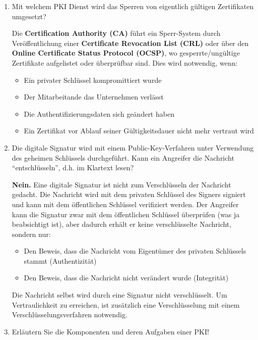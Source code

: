 \documentclass[a4paper]{article}
\begin{document}
\begin{enumerate}
    \item Mit welchem PKI Dienst wird das Sperren von eigentlich gültigen Zertifikaten umgesetzt?
    
    Die \textbf{Certification Authority (CA)} führt ein Sperr-System durch Veröffentlichung einer \textbf{Certificate Revocation List (CRL)} oder über den \textbf{Online Certificate Status Protocol (OCSP)}, wo gesperrte/ungültige Zertifikate aufgelistet oder überprüfbar sind. Dies wird notwendig, wenn:
    \begin{itemize}
        \item Ein privater Schlüssel kompromittiert wurde
        \item Der Mitarbeitande das Unternehmen verlässt
        \item Die Authentifizierungsdaten sich geändert haben
        \item Ein Zertifikat vor Ablauf seiner Gültigkeitsdauer nicht mehr vertraut wird
    \end{itemize}
    
    \item Die digitale Signatur wird mit einem Public-Key-Verfahren unter Verwendung des geheimen Schlüssels durchgeführt. Kann ein Angreifer die Nachricht ``entschlüsseln'', d.h. im Klartext lesen?
    
    \textbf{Nein.} Eine digitale Signatur ist nicht zum Verschlüsseln der Nachricht gedacht. Die Nachricht wird mit dem privaten Schlüssel des Signers signiert und kann mit dem öffentlichen Schlüssel verifiziert werden. Der Angreifer kann die Signatur zwar mit dem öffentlichen Schlüssel überprüfen (was ja beabsichtigt ist), aber dadurch erhält er keine verschlüsselte Nachricht, sondern nur:
    \begin{itemize}
        \item Den Beweis, dass die Nachricht vom Eigentümer des privaten Schlüssels stammt (Authentizität)
        \item Den Beweis, dass die Nachricht nicht verändert wurde (Integrität)
    \end{itemize}
    
    Die Nachricht selbst wird durch eine Signatur nicht verschlüsselt. Um Vertraulichkeit zu erreichen, ist zusätzlich eine Verschlüsselung mit einem Verschlüsselungsverfahren notwendig.
    
    \item Erläutern Sie die Komponenten und deren Aufgaben einer PKI!
    

\end{enumerate}
\end{document}
